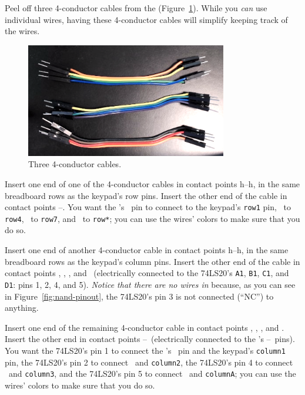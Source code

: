 Peel off three 4-conductor cables from the \rainbow (Figure~\ref{fig:keypad-cables}).
While you \textit{can} use individual wires, having these 4-conductor cables will simplify keeping track of the wires.

\begin{figure}
    \centering
    \includegraphics{keypad/keypad-cables}
    \caption{Three 4-conductor cables. \label{fig:keypad-cables}}
\end{figure}

Insert one end of one of the 4-conductor cables in contact points h--h, in the same breadboard rows as the keypad's row pins.
Insert the other end of the cable in contact points \mcukeypadrowonepoint--\mcukeypadrowstarpoint.
You want the \developmentboard's \mcukeypadrowone\ pin to connect to the keypad's \texttt{row1} pin, \mcukeypadrowfour\ to \texttt{row4}, \mcukeypadrowseven\ to \texttt{row7}, and \mcukeypadrowstar\ to \texttt{row*};
you can use the wires' colors to make sure that you do so.

Insert one end of another 4-conductor cable in contact points h--h, in the same breadboard rows as the keypad's column pins.
Insert the other end of the cable in contact points \nandlowerain, \nandlowerbin, \nandlowercin, and \nandlowerdin\ (electrically connected to the 74LS20's \texttt{A1}, \texttt{B1}, \texttt{C1}, and \texttt{D1}: pins 1, 2, 4, and 5).
\textit{Notice that there are no wires in \nandlowernc} because, as you can see in Figure~\ref{fig:nand-pinout}, the 74LS20's pin 3 is not connected (``NC'') to anything.

Insert one end of the remaining 4-conductor cable in contact points \nandloweraout, \nandlowerbout, \nandlowercout, and \nandlowerdout.
Insert the other end in contact points \mcukeypadcolonepoint--\mcukeypadcolApoint\ (electrically connected to the \developmentboard's \mcukeypadcolone--\mcukeypadcolA\ pins).
You want the 74LS20's pin 1 to connect the \developmentboard's \mcukeypadcolone\ pin and the keypad's \texttt{column1} pin, the 74LS20's pin 2 to connect \mcukeypadcoltwo\ and \texttt{column2}, the 74LS20's pin 4 to connect \mcukeypadcolthree\ and \texttt{column3}, and the 74LS20's pin 5 to connect \mcukeypadcolA\ and \texttt{columnA};
you can use the wires' colors to make sure that you do so.

